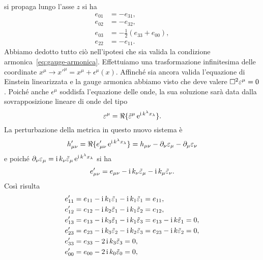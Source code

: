 si propaga lungo l'asse $z$ si ha
\begin{subequations}
  \begin{align}
    e_{01} &= -e_{31}, \\
    e_{02} &= -e_{32}, \\
    e_{03} &= -\frac{1}{2}(e_{33} + e_{00}), \\
    e_{22} &= -e_{11}.
  \end{align}
\end{subequations}
Abbiamo dedotto tutto ciò nell'ipotesi che sia valida la condizione
armonica~\eqref{eq:gauge-armonica}.  Effettuiamo una trasformazione infinitesima
delle coordinate $x^{\mu} \to x'^{\mu} = x^{\mu} + \epsilon^{\mu}(x)$.  Affinché
sia ancora valida l'equazione di Einstein linearizzata e la gauge armonica
abbiamo visto che deve valere $\Box^{2} \varepsilon^{\mu} = 0$.  Poiché anche
$\epsilon^{\mu}$ soddisfa l'equazione delle onde, la sua soluzione sarà data
dalla sovrapposizione lineare di onde del tipo
\begin{equation}
  \varepsilon^{\mu} = \Re\{\tilde{\varepsilon}^{\mu}\operatorname{\mathrm{e}}^{\operatorname{\mathrm{i}} k^{\lambda}x_{\lambda}}\}.
\end{equation}
La perturbazione della metrica in questo nuovo sistema è
\begin{equation}
  h'_{\mu\nu} = \Re\{e'_{\mu\nu} \operatorname{\mathrm{e}}^{\operatorname{\mathrm{i}} k^{\lambda}x_{\lambda}}\} =
  h_{\mu\nu} - \partial_{\nu}\varepsilon_{\mu} - \partial_{\mu}\varepsilon_{\nu}
\end{equation}
e poiché
$\partial_{\nu}\varepsilon_{\mu} = \operatorname{\mathrm{i}} k_{\nu}\tilde{\varepsilon}_{\mu}
\operatorname{\mathrm{e}}^{\operatorname{\mathrm{i}} k^{\lambda}x_{\lambda}}$ si ha
\begin{equation}
  e'_{\mu\nu} = e_{\mu\nu} - \operatorname{\mathrm{i}} k_{\nu}\tilde{\varepsilon}_{\mu} - \operatorname{\mathrm{i}}
  k_{\mu}\tilde{\varepsilon}_{\nu}.
\end{equation}
Così risulta
\begin{subequations}
  \begin{align}
    e'_{11} &= e_{11} - \operatorname{\mathrm{i}} k_{1} \tilde{\varepsilon}_{1} - \operatorname{\mathrm{i}}
    k_{1}\tilde{\varepsilon}_{1} = e_{11}, \\
    e'_{12} &= e_{12} - \operatorname{\mathrm{i}} k_{2}\tilde{\varepsilon}_{1} - \operatorname{\mathrm{i}}
    k_{1}\tilde{\varepsilon}_{2} = e_{12}, \\
    e'_{13} &= e_{13} - \operatorname{\mathrm{i}} k_{3}\tilde{\varepsilon}_{1} - \operatorname{\mathrm{i}}
    k_{1}\tilde{\varepsilon}_{3} = e_{13} - \operatorname{\mathrm{i}} k\tilde{\varepsilon}_{1} = 0, \\
    e'_{23} &= e_{23} - \operatorname{\mathrm{i}} k_{3}\tilde{\varepsilon}_{2} - \operatorname{\mathrm{i}}
    k_{2}\tilde{\varepsilon}_{3} = e_{23} - \operatorname{\mathrm{i}} k\tilde{\varepsilon}_{2} = 0, \\
    e'_{33} &= e_{33} - 2\operatorname{\mathrm{i}} k_{3}\tilde{\varepsilon}_{3} = 0, \\
    e'_{00} &= e_{00} - 2\operatorname{\mathrm{i}} k_{0}\tilde{\varepsilon}_{0} = 0,
  \end{align}
\end{subequations}
